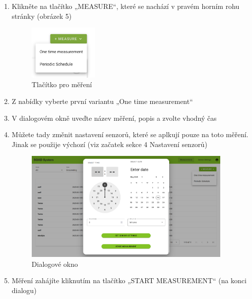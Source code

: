 \documentclass[12pt]{article}
\begin{document}
\begin{teamwork}
        \begin{enumerate}
            \item Klikněte na tlačítko „MEASURE“, které se nachází v pravém horním rohu stránky (obrázek 5)
            \begin{figure}[hbt!]
                \centering
                \includegraphics[width=0.32\textwidth]{../../img/measure_one_time_button}
                \caption{Tlačítko pro měření}
                \label{fig:measure_one_time}
            \end{figure}
            \item Z nabídky vyberte první variantu „One time measurement“
            \item V dialogovém okně uveďte název měření, popis a zvolte vhodný čas
            \item Můžete tady změnit nastavení senzorů, které se aplkují pouze na toto měření.
            Jinak se použije výchozí (viz začatek sekce 4 Nastavení senzorů)
            \begin{figure}[hbt!]
                  \centering
                  \includegraphics[width=0.95\textwidth]{../../img/one_time_measure_dialog}
                  \caption{Dialogové okno}
                  \label{fig:one_time_measure_dialog}
            \end{figure}
            \item Měření zahájíte kliknutím na tlačítko „START MEASUREMENT“ (na konci dialogu)
        \end{enumerate}


\end{teamwork}
\end{document}
